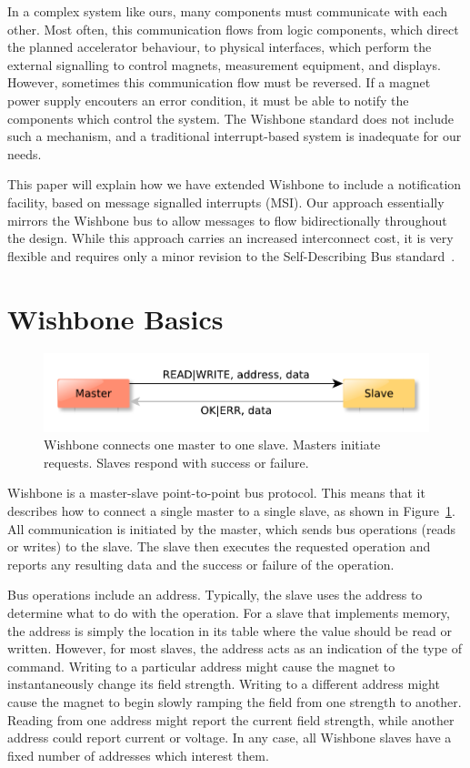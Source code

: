 \documentclass[a4paper]{jacow}
\begin{document}
In a complex system like ours, many components must communicate with each other.
Most often, this communication flows from logic components, which direct the
planned accelerator behaviour, to physical interfaces, which perform the
external signalling to control magnets, measurement equipment, and displays.
However, sometimes this communication flow must be reversed.
If a magnet power supply encouters an error condition, 
it must be able to notify the components which control the system.
The Wishbone standard does not include such a mechanism,
and a traditional interrupt-based system is inadequate for our needs.

This paper will explain how we have extended Wishbone to include a
notification facility, based on message signalled interrupts (MSI).
Our approach essentially mirrors the Wishbone bus to allow messages to flow
bidirectionally throughout the design.
While this approach carries an increased interconnect cost, 
it is very flexible and requires only a minor revision to the
Self-Describing Bus standard~\cite{sdb}.

\section{Wishbone Basics}

\begin{figure}[t]
  \centering
  \includegraphics*[width=\columnwidth]{wb-ptp}
  \caption{Wishbone connects one master to one slave. 
  Masters initiate requests. Slaves respond with
  success or failure.}
  \label{fig:wb-ptp}
\end{figure}

Wishbone is a master-slave point-to-point bus protocol.
This means that it describes how to connect a single master to a single slave,
as shown in Figure~\ref{fig:wb-ptp}.
All communication is initiated by the master,
which sends bus operations (reads or writes) to the slave.
The slave then executes the requested operation and reports any resulting
data and the success or failure of the operation.

Bus operations include an address.
Typically, the slave uses the address to determine what to do with the operation.
For a slave that implements memory, the address is simply the location in
its table where the value should be read or written.
However, for most slaves, the address acts as an indication of the type of command.
Writing to a particular address might cause the magnet to instantaneously
change its field strength.
Writing to a different address might cause the magnet to begin slowly ramping 
the field from one strength to another.
Reading from one address might report the current field strength,
while another address could report current or voltage.
In any case,
all Wishbone slaves have a fixed number of addresses which interest them.
\end{document}

